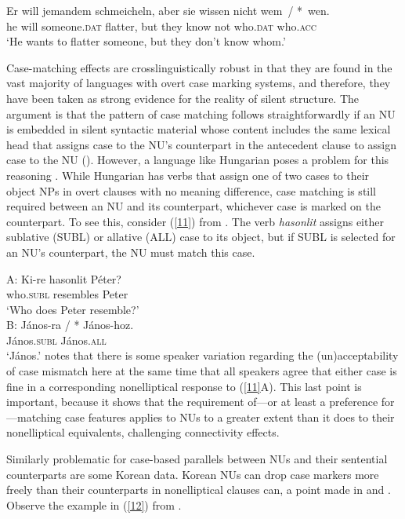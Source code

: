 \documentclass[output=paper
	        ,collection
	        ,collectionchapter
 	        ,biblatex
                ,babelshorthands
                ,newtxmath
                ,draftmode
                ,colorlinks, citecolor=brown
]{langscibook}
\begin{document}
{\ea
\gll Er will jemandem schmeicheln, aber sie wissen nicht wem~/ *~wen.\\
     he will someone.\textsc{dat} flatter, but they know not who.\textsc{dat}  who.\textsc{acc}\\
\glt `He wants to flatter someone, but they don't know whom.'\label{10}\z


Case-matching effects are crosslinguistically robust in that they are found in the vast majority of languages with overt case marking systems, and therefore, they have been taken as strong evidence for the reality of silent structure. The argument is that the pattern of case matching follows straightforwardly if an NU is embedded in silent syntactic material whose content includes the same lexical head that assigns case to the NU's counterpart in the antecedent clause to assign case to the NU (\citealt{Merchant2001, Merchant2005a}). However, a language like Hungarian poses a problem for this reasoning \citep{Jacobson2016}. While Hungarian has verbs that assign one of two cases to their object NPs in overt clauses with no meaning difference, case matching is still required between an NU and its counterpart, whichever case is marked on the counterpart. To see this, consider (\ref{11}) from \citet[356]{Jacobson2016}. The verb \emph{hasonlit} assigns either sublative (SUBL) or allative (ALL) case to its object, but if SUBL is selected for an NU's counterpart, the NU must match this case.

\ea
A: \gll Ki-re hasonlit P\'{e}ter?\\
        who.\textsc{subl} resembles Peter\\
   \glt  `Who does Peter resemble?'\\

B: \gll J\'{a}nos-ra / * J\'{a}nos-hoz.\\
        J\'{a}nos.\textsc{subl} {} {} J\'{a}nos.\textsc{all}\\
\glt  `J\'{a}nos.'\label{11}
\z
%
\citet{Jacobson2016} notes that there is some speaker variation regarding the (un)ac\-cepta\-bi\-li\-ty of case mismatch here at the same time that all speakers agree that either case is fine in a corresponding nonelliptical response to (\ref{11}A). This last point is important, because it shows that the requirement of---or at least a preference for---matching case features applies to NUs to a greater extent than it does to their nonelliptical equivalents, challenging connectivity effects.

Similarly problematic for case-based parallels between NUs and their sentential counterparts are some Korean data. Korean NUs can drop case markers more freely than their counterparts in nonelliptical clauses can, a point made in \citet{Morgan1989} and \citet{Kim2015}. Observe the example in (\ref{12}) from \citet[237]{Morgan1989}.

}
\end{document}

